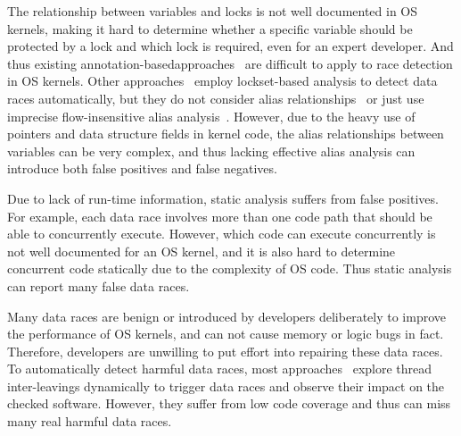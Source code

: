 The relationship between variables and locks is 
not well documented in OS kernels, making it hard to determine whether a 
specific variable should be protected by a lock and which lock is required, 
even for an expert developer. And thus existing 
annotation-basedapproaches~\cite{Boyapati:OOPSLA02, Anderson:PLDI08, 
Anderson:PLDI09, Zhou:MICRO19, Flanagan:PASTE01, Flanagan:PLDI00, 
Sadowski:PLATEAU14, ClangThreadSafety, Blackshear:OOPSLA18} are difficult to 
apply to race detection in OS kernels. Other approaches~\cite{Choi:PLDI02, 
Engler:SOSP03, Voung:FSE07, Pratikakis:PLDI06, Naik:PLDI06} employ 
lockset-based analysis to detect data races automatically, but they do not 
consider alias relationships~\cite{Voung:FSE07, Engler:SOSP03} or just use 
imprecise flow-insensitive alias analysis~\cite{Choi:PLDI02, 	
Pratikakis:PLDI06, Naik:PLDI06}. However, due to the heavy use of pointers and 
data structure fields in kernel code, the alias relationships between variables 
can be very complex, and thus lacking effective alias analysis can introduce 
both false positives and false negatives.

 Due to lack of run-time information, static 
analysis suffers from false positives. For example, each data race involves 
more than one code path that should be able to concurrently execute. However, 
which code can execute concurrently is not well documented for an OS kernel, 
and it is also hard to determine concurrent code statically due to the 
complexity of OS code. Thus static analysis can report many false data races.

 Many data races are benign or 
introduced by developers deliberately to improve the performance of OS kernels, 
and can not cause memory or logic bugs in fact. Therefore, developers are 
unwilling to put effort into repairing these data races. To automatically 
detect harmful data races, most approaches~\cite{Narayanasamy:PLDI07, 
Sen:PLDI08, Kasikci:SOSP13, Kasikci:ASPLOS12} explore thread inter-leavings 
dynamically to trigger data races and observe their impact on the checked 
software. However, they suffer from low code coverage and thus can miss many 
real harmful data races.




